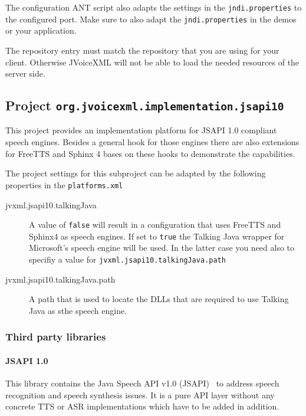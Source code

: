 \documentclass[11pt,a4paper]{article}
\begin{document}
The configuration ANT script also adapts the settings in the
\texttt{jndi.properties} to the configured port. Make sure to also adapt
the \texttt{jndi.properties} in the demos or your application.

The repository entry must match the repository that you are using for your
client. Otherwise JVoiceXML will not be able to load the needed resources of
the server side.

\subsection{Project \texttt{org.jvoicexml.implementation.jsapi10}}
\label{sec:implementation-jsapi10}

This project provides an implementation platform for JSAPI 1.0 compliant
speech engines. Besides a general hook for those engines there are also
extensions for FreeTTS and Sphinx 4 bases on these hooks to demonstrate the
capabilities.

The project settings for this subproject can be adapted by the following
properties in the \texttt{platforms.xml}

\begin{description}
\item[jvxml.jsapi10.talkingJava] A value of \texttt{false} will result in a
configuration that uses FreeTTS and Sphinx4 as speech engines. If set to
\texttt{true} the Talking Java wrapper for Microsoft's speech engine will be
used. In the latter case you need also to specifiy a value for
\texttt{jvxml.jsapi10.talkingJava.path}
\item[jvxml.jsapi10.talkingJava.path] A path that is used to locate the DLLs
that are required to use Talking Java as sthe speech engine.
\end{description}

\subsubsection{Third party libraries}
\label{sec:jsapi10-third-party-libr}

\paragraph{JSAPI 1.0}

This library contains the Java Speech API v1.0
(JSAPI)~\cite{sun:jsapi} to address speech recognition and speech synthesis
issues. It is a pure API layer without any concrete TTS or ASR implementations
which have to be added in addition.
\end{document}
